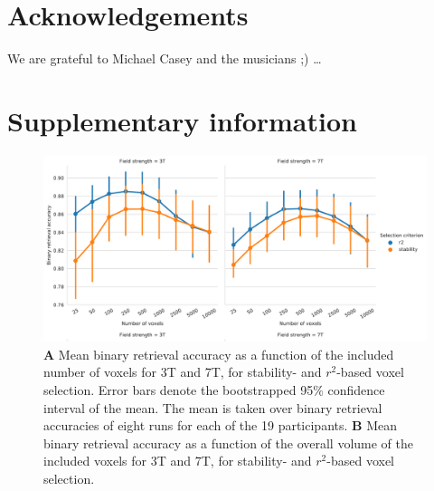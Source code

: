 \section*{Acknowledgements}

We are grateful to Michael Casey and the musicians ;) \ldots




\beginsupplement
\newpage
\section*{Supplementary information} \label{supplemental}
\begin{figure}[H]
  \centering
  \includegraphics[width=\linewidth]{pics/binary_selection.pdf}
	
  \caption{\textbf{A} Mean binary retrieval accuracy as a function of the
  included number of voxels for 3T and 7T, for stability- and $r^2$-based
  voxel selection. Error bars denote the bootstrapped 95\% confidence interval
  of the mean. The mean is taken over binary retrieval accuracies of eight runs
  for each of the 19 participants. \textbf{B} Mean binary retrieval accuracy as
a function of the overall volume of the included voxels for 3T and 7T, for
stability- and $r^2$-based voxel selection.
}

 \label{fig:binary_retrieval_selection}\end{figure}

